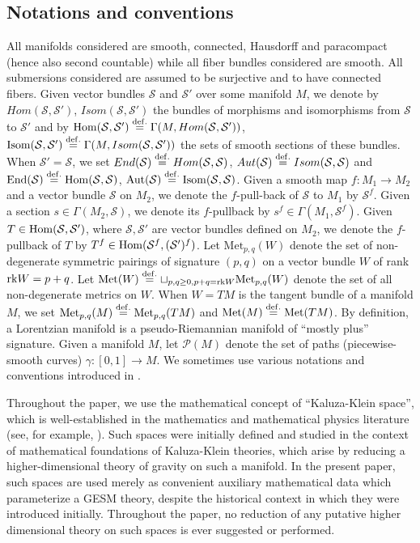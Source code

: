 \documentclass[10pt, cmp, numbook, final, a4paper]{svjour}
\newcommand{\Hom}{{\rm Hom}}
\newcommand{\End}{\mathrm{End}}
\newcommand{\Aut}{\mathrm{Aut}}
\newcommand{\eqdef}{\stackrel{{\rm def.}}{=}}
\def\rk{{\rm rk}}
\def\cP{\mathcal{P}}
\def\cS{\mathcal{S}}
\def\Isom{\mathrm{Isom}}
\def\Met{\mathrm{Met}}
\begin{document}
\subsection{Notations and conventions}

All manifolds considered are smooth, connected, Hausdorff and
paracompact (hence also second countable) while all fiber bundles
considered are smooth. All submersions considered are assumed to be
surjective and to have connected fibers.  Given vector bundles $\cS$
and $\cS'$ over some manifold $M$, we denote by $Hom(\cS,\cS')$,
$Isom(\cS,\cS')$ the bundles of morphisms and isomorphisms from $\cS$
to $\cS'$ and by $\Hom(\cS,\cS')\eqdef \Gamma(M, Hom(\cS,\cS'))$,
$\Isom(\cS,\cS')\eqdef \Gamma(M, Isom(\cS,\cS'))$ the sets of smooth
sections of these bundles. When $\cS'=\cS$, we set $End(\cS)\eqdef
Hom(\cS,\cS)$, $Aut(\cS)\eqdef Isom(\cS,\cS)$ and $\End(\cS)\eqdef
\Hom(\cS,\cS)$, $\Aut(\cS)\eqdef \Isom(\cS,\cS)$. Given a smooth map
$f:M_1\rightarrow M_2$ and a vector bundle $\cS$ on $M_2$, we denote
the $f$-pull-back of $\cS$ to $M_1$ by $\cS^f$. Given a section $s\in
\Gamma(M_2,\cS)$, we denote its $f$-pullback by $s^f\in
\Gamma(M_1,\cS^f)$. Given $T\in \Hom(\cS,\cS')$, where $\cS,\cS'$ are
vector bundles defined on $M_2$, we denote the $f$-pullback of $T$ by
$T^f\in \Hom(\cS^f,(\cS')^f)$.  Let $\Met_{p,q}(W)$ denote the set of
non-degenerate symmetric pairings of signature $(p,q)$ on a vector
bundle $W$ of rank $\rk W=p+q$. Let $\Met(W)\eqdef \sqcup_{p,q\geq 0,
  p+q=\rk W}\Met_{p,q}(W)$ denote the set of all non-degenerate
metrics on $W$. When $W=TM$ is the tangent bundle of a manifold $M$,
we set $\Met_{p,q}(M)\eqdef \Met_{p,q}(TM)$ and $\Met(M)\eqdef
\Met(TM)$.  By definition, a Lorentzian manifold is a
pseudo-Riemannian manifold of ``mostly plus'' signature. Given a
manifold $M$, let $\cP(M)$ denote the set of paths (piecewise-smooth
curves) $\gamma:[0,1]\rightarrow M$. We sometimes use various
notations and conventions introduced in \cite{GESM}.

\begin{remark}
Throughout the paper, we use the mathematical concept of
``Kaluza-Klein space'', which is well-established in the mathematics
and mathematical physics literature (see, for example,
\cite{Bourguignon,Hogan,Betounes1,Betounes2,Besse}). Such spaces were
initially defined and studied in the context of mathematical
foundations of Kaluza-Klein theories, which arise by reducing a
higher-dimensional theory of gravity on such a manifold. In the present
paper, such spaces are used merely as convenient auxiliary
mathematical data which parameterize a GESM theory, despite the
historical context in which they were introduced initially. Throughout
the paper, no reduction of any putative higher dimensional theory on
such spaces is ever suggested or performed.
\end{remark}
\end{document}

